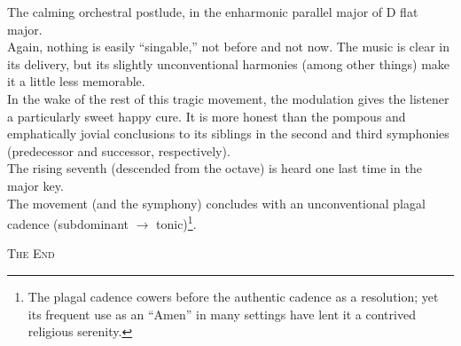 \documentclass{beamer}
\begin{document}
\begin{frame}
  The calming orchestral postlude, in the enharmonic parallel major of D flat major. 
  \pause \\
  Again, nothing is easily ``singable,'' not before and not now. The music is clear in its delivery, but its slightly unconventional harmonies (among other things) make it a little less memorable. 
  \pause \\
  In the wake of the rest of this tragic movement, the modulation gives the listener a particularly sweet happy cure. It is more honest than the pompous and emphatically jovial conclusions to its siblings in the second and third symphonies (predecessor and successor, respectively). 
  \pause \\
  The rising seventh (descended from the octave) is heard one last time in the major key. 
  \pause \\ 
  The movement (and the symphony) concludes with an unconventional plagal cadence (subdominant \(\to\) tonic)\footnote{The plagal cadence cowers before the authentic cadence as a resolution; yet its frequent use as an ``Amen'' in many settings have lent it a contrived religious serenity.}. 
\end{frame} 

\begin{frame}
  \begin{center} 
    {\Large\textsc{The End} } 
  \end{center} 
\end{frame} 
\end{document}
